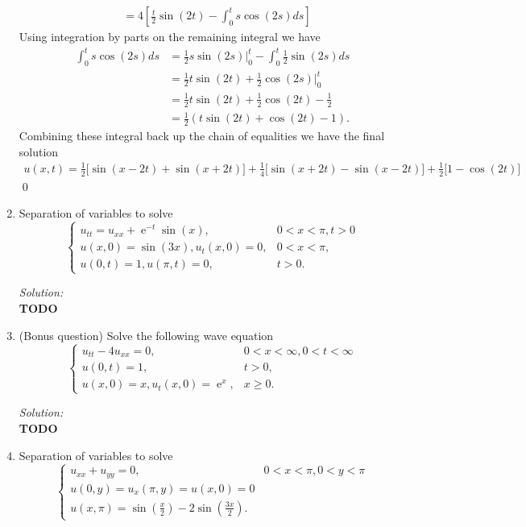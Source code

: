 \documentclass[10pt]{amsart}
\DeclareMathOperator{\E}{e}
\theoremstyle{nonumberplain}
\begin{document}
\begin{enumerate}[label={\bf {\arabic*}:}]
\begin{align*}
	&= 4\left[ \frac t 2 \sin (2t) - \int_0^t s \cos (2s) ds \right]
\end{align*}
Using integration by parts on the remaining integral we have
\begin{align*}
\int_0^t s \cos (2s) ds
	&= \frac 1 2 s \sin (2s) \Big|_0^t  - \int_0^t \frac 1 2 \sin (2s) ds \\
	&= \frac 1 2 t \sin (2t)  +  \frac 1 2 \cos (2s) \Big|_0^t \\
	&= \frac 1 2 t \sin (2t)  +  \frac 1 2 \cos (2t) - \frac 1 2 \\
	&= \frac 1 2 \left( t \sin (2t)  +  \cos (2t) - 1 \right).
\end{align*}
Combining these integral back up the chain of equalities we have the final solution
\begin{align*}
u(x, t) = \frac 1 2 \Big[ \sin(x - 2t) + \sin(x + 2t) \Big] + \frac 1 4 \Big[ \sin (x + 2t) - \sin(x - 2t) \Big] + \frac 1 2 \Big[ 1 - \cos (2t) \Big]
\end{align*}
\qed \\


\newpage


\item Separation of variables to solve
$$
\begin{cases}
u_{tt} = u_{xx} + \E^{-t}\sin(x), & 0 < x < \pi, t > 0 \\
u(x, 0) = \sin(3x), u_t(x, 0) = 0, & 0 < x < \pi, \\
u(0, t) = 1, u(\pi, t) = 0, & t > 0.
\end{cases}
$$

\noindent
\textit{Solution:} \\
\textbf{TODO}

\newpage

\item (Bonus question) Solve the following wave equation
$$
\begin{cases}
u_{tt} - 4 u_{xx} = 0, & 0 < x < \infty, 0 < t < \infty \\
u(0, t) = 1, & t > 0, \\
u(x, 0) = x, u_t(x, 0) = \E^x, & x \geq 0.
\end{cases}
$$

\noindent
\textit{Solution:} \\
\textbf{TODO}

\newpage


\item Separation of variables to solve
$$
\begin{cases}
u_{xx} + u_{yy} = 0, & 0 < x < \pi, 0 < y < \pi \\
u(0, y) = u_x(\pi, y) = u(x, 0) = 0 \\
u(x, \pi) = \sin \left( \frac x 2 \right) - 2 \sin \left( \frac {3x}{2} \right).
\end{cases}
$$


\end{enumerate}
\end{document}
